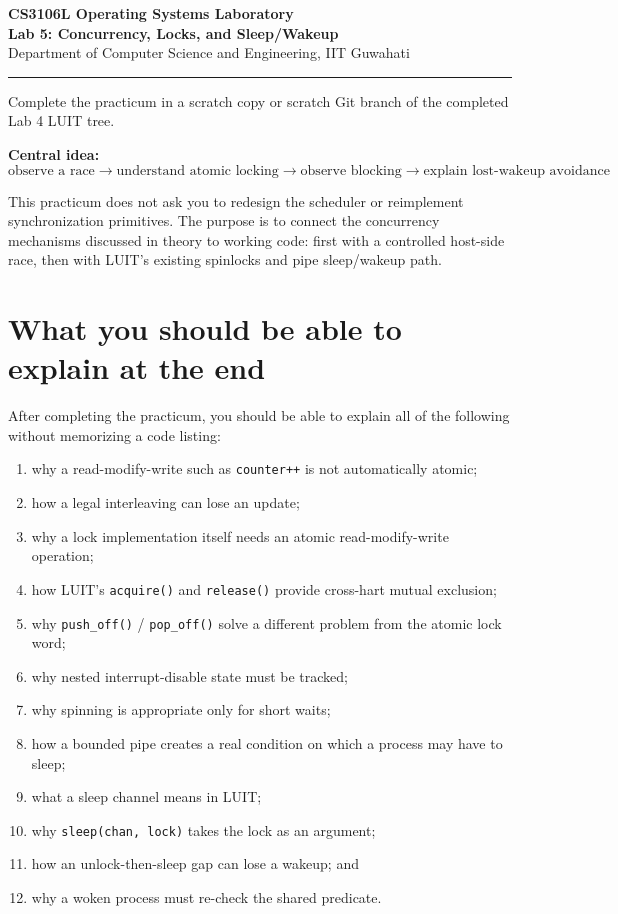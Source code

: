 \documentclass[11pt,a4paper]{article}
\newcommand{\file}[1]{\texttt{#1}}
\begin{document}
\begin{center}
{\Large\bfseries CS3106L Operating Systems Laboratory}\\[2mm]
{\LARGE\bfseries Lab 5: Concurrency, Locks, and Sleep/Wakeup}\\[2mm]
Department of Computer Science and Engineering, IIT Guwahati
\end{center}

\hrule
\vspace{4mm}

Complete the practicum in a scratch copy or scratch Git branch of the completed Lab 4 LUIT tree.

\textbf{Central idea:}
\[
\boxed{\text{observe a race} \rightarrow \text{understand atomic locking} \rightarrow
\text{observe blocking} \rightarrow \text{explain lost-wakeup avoidance}}
\]

This practicum does not ask you to redesign the scheduler or reimplement synchronization primitives. The purpose is to connect the concurrency mechanisms discussed in theory to working code: first with a controlled host-side race, then with LUIT's existing spinlocks and pipe sleep/wakeup path.

\section{What you should be able to explain at the end}

After completing the practicum, you should be able to explain all of the following without memorizing a code listing:

\begin{enumerate}[leftmargin=7mm]
\item why a read-modify-write such as \file{counter++} is not automatically atomic;
\item how a legal interleaving can lose an update;
\item why a lock implementation itself needs an atomic read-modify-write operation;
\item how LUIT's \file{acquire()} and \file{release()} provide cross-hart mutual exclusion;
\item why \file{push\_off()} / \file{pop\_off()} solve a different problem from the atomic lock word;
\item why nested interrupt-disable state must be tracked;
\item why spinning is appropriate only for short waits;
\item how a bounded pipe creates a real condition on which a process may have to sleep;
\item what a sleep channel means in LUIT;
\item why \file{sleep(chan, lock)} takes the lock as an argument;
\item how an unlock-then-sleep gap can lose a wakeup; and
\item why a woken process must re-check the shared predicate.
\end{enumerate}
\end{document}
